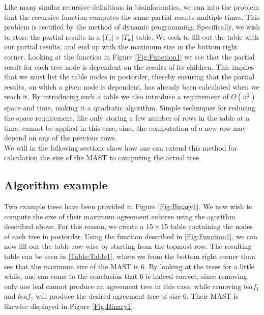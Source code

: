 Like many similar recursive definitions in bioinformatics, we run into the problem that the recursive function computes the same partial results multiple times. This problem is rectified by the method of dynamic programming. Specifically, we wish to store the partial results in a $|T_a| \times |T_w|$ table. We seek to fill out the table with our partial results, and end up with the maximum size in the bottom right corner.
Looking at the function in Figure \ref{Fig:Function1} we see that the partial result for each tree node is dependent on the results of its children. This implies that we must list the table nodes in postorder, thereby ensuring that the partial results, on which a given node is dependent, has already been calculated when we reach it. 
By introducing such a table we also introduce a requirement of $O(n^2)$ space and time, making it a quadratic algorithm. Simple techniques for reducing the space requirement, like only storing a few number of rows in the table at a time, cannot be applied in this case, since the computation of a new row may depend on any of the previous rows.  
\\
We will in the following sections show how one can extend this method for calculation the size of the MAST to computing the actual tree.

\subsection{Algorithm example}
Two example trees have been provided in Figure \ref{Fig:Binary1}. We now wish to compute the size of their maximum agreement subtree using the agorithm described above. For this reason, we create a $15 \times 15$ table containing the nodes of each tree in postorder. Using the function described in \ref{Fig:Function1}, we can now fill out the table row wise by starting from the topmost row. The resulting table can be seen in \ref{Table:Table1}, where we from the bottom right corner than see that the maximum size of the MAST is 6. By looking at the trees for a little while, one can come to the conclusion that 6 is indeed correct, since removing only one leaf cannot produce an agreement tree in this case, while removing $leaf_1$ and $leaf_7$ will produce the desired agreement tree of size 6. Their MAST is likewise displayed in Figure \ref{Fig:Binary1}. 

